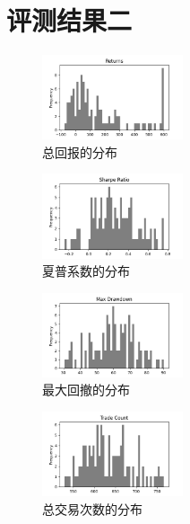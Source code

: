 \documentclass[final,5p,times,twocolumn,authoryear]{elsarticle}
\begin{document}
\section{评测结果二}
\label{sec:performance2}
\begin{figure}[h!]
       \centering
       \includegraphics[width=0.37\textwidth]{img/2/Returns.png} %
       \caption{总回报的分布} %
\end{figure}
\begin{figure}[h!]
       \centering
       \includegraphics[width=0.37\textwidth]{img/2/Sharpe Ratio.png} %
       \caption{夏普系数的分布} %
\end{figure}
\begin{figure}[h!]
       \centering
       \includegraphics[width=0.37\textwidth]{img/2/Max Drawdown.png} %
       \caption{最大回撤的分布} %
\end{figure}
\begin{figure}[h!]
       \centering
       \includegraphics[width=0.37\textwidth]{img/2/Trade Count.png} %
       \caption{总交易次数的分布} %
\end{figure}
\end{document}
